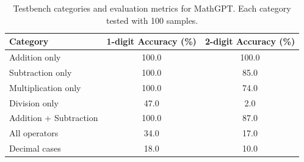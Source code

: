 
\begin{table}[H]
\centering
\renewcommand{\arraystretch}{1.2}
\begin{tabular}{>{\raggedright}p{5cm} c c}
\toprule
\textbf{Category} & \textbf{1-digit Accuracy (\%)} & \textbf{2-digit Accuracy (\%)} \\
\midrule
Addition only & 100.0 & 100.0 \\
Subtraction only & 100.0 & 85.0 \\
Multiplication only & 100.0 & 74.0 \\
Division only & 47.0 & 2.0 \\
Addition + Subtraction & 100.0 & 87.0 \\
All operators & 34.0 & 17.0 \\
Decimal cases & 18.0 & 10.0 \\
\bottomrule
\end{tabular}
\caption{Testbench categories and evaluation metrics for MathGPT. Each category tested with 100 samples.}
\label{tab:testbench}
\end{table}
